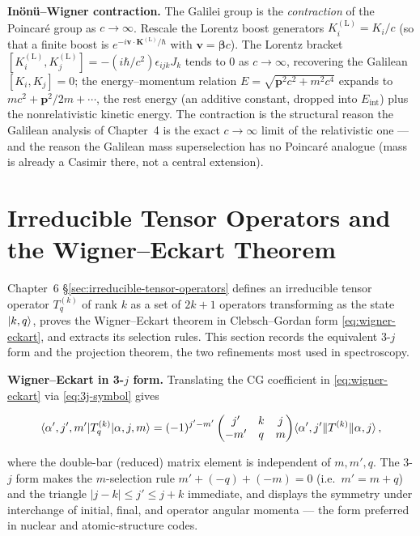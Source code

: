 \medskip\noindent\textbf{In\"on\"u--Wigner contraction.} The Galilei group is the \emph{contraction} of the Poincar\'e group as $c\to\infty$. Rescale the Lorentz boost generators $K_{i}^{\mathrm{(L)}}=K_{i}/c$ (so that a finite boost is $e^{-i\bm v\cdot\bm K^{\mathrm{(L)}}/\hbar}$ with $\bm v=\bm\beta c$). The Lorentz bracket $[K_{i}^{\mathrm{(L)}},K_{j}^{\mathrm{(L)}}]=-(i\hbar/c^{2})\epsilon_{ijk}J_{k}$ tends to $0$ as $c\to\infty$, recovering the Galilean $[K_{i},K_{j}]=0$; the energy--momentum relation $E=\sqrt{\bm p^{2}c^{2}+m^{2}c^{4}}$ expands to $mc^{2}+\bm p^{2}/2m+\cdots$, the rest energy (an additive constant, dropped into $E_{\mathrm{int}}$) plus the nonrelativistic kinetic energy. The contraction is the structural reason the Galilean analysis of Chapter~4 is the exact $c\to\infty$ limit of the relativistic one --- and the reason the Galilean mass superselection has no Poincar\'e analogue (mass is already a Casimir there, not a central extension).

\section{Irreducible Tensor Operators and the Wigner--Eckart Theorem}
\label{sec:appendix-tensor-operators}

Chapter~6 \S\ref{sec:irreducible-tensor-operators} defines an irreducible tensor operator $T^{(k)}_{q}$ of rank $k$ as a set of $2k+1$ operators transforming as the state $\ket{k,q}$, proves the Wigner--Eckart theorem in Clebsch--Gordan form \eqref{eq:wigner-eckart}, and extracts its selection rules. This section records the equivalent 3-$j$ form and the projection theorem, the two refinements most used in spectroscopy.

\medskip\noindent\textbf{Wigner--Eckart in 3-$j$ form.} Translating the CG coefficient in \eqref{eq:wigner-eckart} via \eqref{eq:3j-symbol} gives
\begin{linenomath}
\begin{equation}
\braket{\alpha',j',m'|T^{(k)}_{q}|\alpha,j,m}
=(-1)^{j'-m'}\begin{pmatrix}j'&k&j\\ -m'&q&m\end{pmatrix}\!\braket{\alpha',j'\|T^{(k)}\|\alpha,j},
\label{eq:wigner-eckart-3j}
\end{equation}
\end{linenomath}
where the double-bar (reduced) matrix element is independent of $m,m',q$. The 3-$j$ form makes the $m$-selection rule $m'+(-q)+(-m)=0$ (i.e.\ $m'=m+q$) and the triangle $|j-k|\le j'\le j+k$ immediate, and displays the symmetry under interchange of initial, final, and operator angular momenta --- the form preferred in nuclear and atomic-structure codes.


